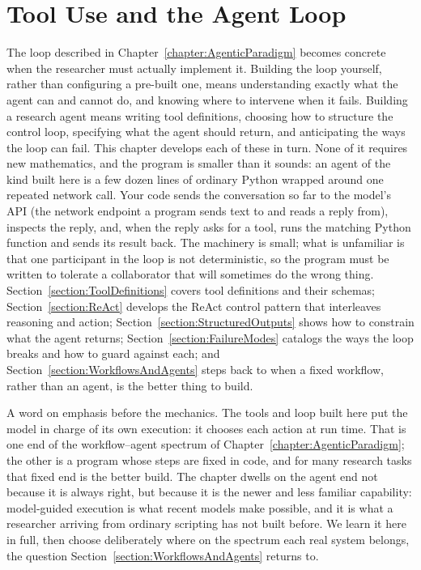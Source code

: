 \chapter{Tool Use and the Agent Loop}
\label{chapter:AgentLoop}

The loop described in Chapter~\ref{chapter:AgenticParadigm} becomes concrete when the researcher must actually implement it.
Building the loop yourself, rather than configuring a pre-built one, means understanding exactly what the agent can and cannot do, and knowing where to intervene when it fails.
Building a research agent means writing tool definitions, choosing how to structure the control loop, specifying what the agent should return, and anticipating the ways the loop can fail.
This chapter develops each of these in turn.
None of it requires new mathematics, and the program is smaller than it sounds: an agent of the kind built here is a few dozen lines of ordinary Python wrapped around one repeated network call.
Your code sends the conversation so far to the model's API (the network endpoint a program sends text to and reads a reply from), inspects the reply, and, when the reply asks for a tool, runs the matching Python function and sends its result back.
The machinery is small; what is unfamiliar is that one participant in the loop is not deterministic, so the program must be written to tolerate a collaborator that will sometimes do the wrong thing.
Section~\ref{section:ToolDefinitions} covers tool definitions and their schemas; Section~\ref{section:ReAct} develops the ReAct control pattern that interleaves reasoning and action; Section~\ref{section:StructuredOutputs} shows how to constrain what the agent returns; Section~\ref{section:FailureModes} catalogs the ways the loop breaks and how to guard against each; and Section~\ref{section:WorkflowsAndAgents} steps back to when a fixed workflow, rather than an agent, is the better thing to build.

A word on emphasis before the mechanics.
The tools and loop built here put the model in charge of its own execution: it chooses each action at run time.
That is one end of the workflow--agent spectrum of Chapter~\ref{chapter:AgenticParadigm}; the other is a program whose steps are fixed in code, and for many research tasks that fixed end is the better build.
The chapter dwells on the agent end not because it is always right, but because it is the newer and less familiar capability: model-guided execution is what recent models make possible, and it is what a researcher arriving from ordinary scripting has not built before.
We learn it here in full, then choose deliberately where on the spectrum each real system belongs, the question Section~\ref{section:WorkflowsAndAgents} returns to.

